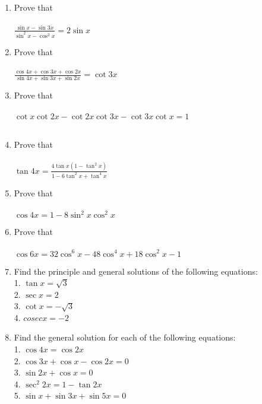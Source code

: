 \begin{enumerate}[label=\arabic*]
\item Prove that\\
\\$\frac{\sin x-\sin3x}{\sin^{2}x-\cos^{2}x}=2\sin x$\\

\item Prove that\\
\\$\frac{\cos4x+\cos3x+\cos2x}{\sin4x+\sin3x+\sin2x}=\cot3x$\\

\item Prove that\\
\\$\cot x\cot2x-\cot2x\cot3x-\cot3x\cot x=1$\\\\

\item Prove that\\
\\$\tan4x=\frac{4\tan x(1-\tan^{2}x)}{1-6\tan^{2}x+\tan^{4}x}$\\

\item Prove that\\
\\$\cos4x=1-8\sin^{2}x\cos^{2}x$\\

\item Prove that\\
\\$\cos6x=32\cos^{6}x-48\cos^{4}x+18\cos^{2}x-1$\\

\item Find the principle and general solutions of the following equations:\\
1. $\tan x=\sqrt 3$\\
2. $\sec x=2$\\
3. $\cot x=-\sqrt 3$\\
4. $cosec x=-2$\\

\item Find the general solution for each of the following equations:\\
1. $\cos4x=\cos2x$\\
2. $\cos3x+\cos x-\cos2x=0$\\
3. $\sin2x+\cos x=0$\\
4. $\sec^{2}2x=1-\tan2x$\\
5. $\sin x+\sin3x+\sin5x=0$\\


\end{enumerate}
